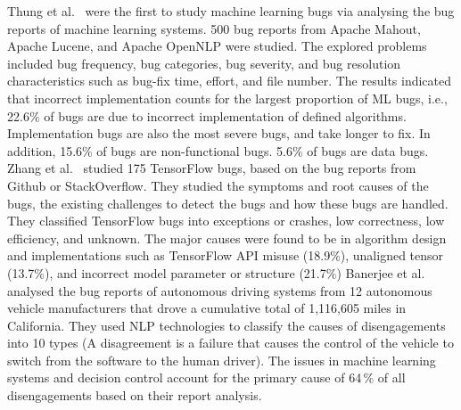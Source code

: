 \label{sec:bugreport}
Thung et al.~ were the first to study machine learning bugs via analysing the bug reports of machine learning systems.
500 bug reports from Apache Mahout, Apache Lucene, and Apache OpenNLP were studied.
The explored problems included bug frequency, bug categories, bug severity, and bug resolution characteristics such as bug-fix time, effort, and file number.
The results indicated that incorrect implementation counts for the largest proportion of ML bugs, i.e., 22.6\% of bugs are due to incorrect implementation of defined algorithms.
Implementation bugs are also the most severe bugs, and take longer to fix.
In addition,
15.6\% of bugs are non-functional bugs. 
5.6\% of bugs are data bugs.
Zhang et al.~ studied 175 TensorFlow bugs, based on the bug reports from Github or StackOverflow.
They studied the symptoms and root causes of the bugs, the existing challenges to detect the bugs and how these bugs are handled.
They classified TensorFlow bugs into exceptions or crashes, low correctness,
low efficiency, and unknown.
The major causes were found to be in algorithm design and implementations such as TensorFlow API misuse (18.9\%), unaligned tensor (13.7\%), and incorrect model parameter or structure (21.7\%)
Banerjee et al.~ analysed the bug reports of autonomous driving systems from 12 autonomous vehicle manufacturers that drove a cumulative total of 1,116,605 miles in California.
They used NLP technologies to classify the causes of disengagements into 10 types (A disagreement is a failure that causes the control of the vehicle to switch from the software
to the human driver).
The issues in machine learning systems and decision control account for the primary cause of 64\,\% of all disengagements based on their report analysis.

